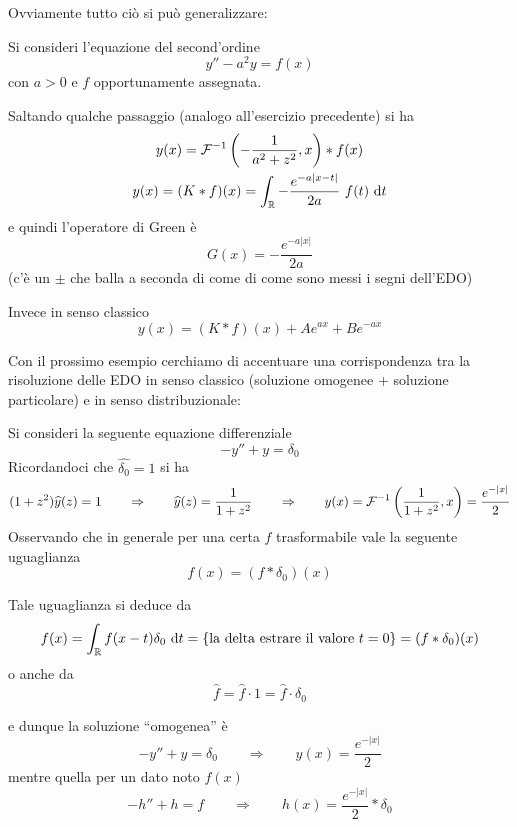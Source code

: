 Ovviamente tutto ciò si può generalizzare:
\begin{exa}
Si consideri l'equazione del second'ordine
\begin{equation*}
y''-a^2y=f(x)
\end{equation*}
con $a>0$ e $f$ opportunamente assegnata.

Saltando qualche passaggio (analogo all'esercizio precedente) si ha
\begin{gather*}
y(x)=\mathcal{F}^{-1}\left(-\frac{1}{a^2+z^2},x\right)*f(x) \\
y(x)=(K*f)(x)=\int_{\mathbb{R}} -\frac{e^{-a|x-t|}}{2a}\ f(t)\  \mathrm{d} t
\end{gather*}
e quindi l'operatore di Green è
\begin{equation*}
G(x)=-\frac{e^{-a|x|}}{2a}
\end{equation*}
(c'è un $\pm$ che balla a seconda di come di come sono messi i segni dell'EDO)

Invece in senso classico
\begin{equation*}
y(x)=(K*f)(x)+Ae^{ax}+Be^{-ax}
\end{equation*}
\end{exa}

Con il prossimo esempio cerchiamo di accentuare una corrispondenza tra la risoluzione delle EDO in senso classico (soluzione omogenee + soluzione particolare) e in senso distribuzionale:
\begin{exa}
Si consideri la seguente equazione differenziale
\begin{equation*}
-y''+y=\delta_0
\end{equation*}
Ricordandoci che $\hat{\delta_0}=1$ si ha
\begin{equation*}
(1+z^2)\widehat{y}(z)=1\qquad\Rightarrow\qquad \widehat{y}(z)=\frac{1}{1+z^2}\qquad\Rightarrow\qquad  y(x)=\mathcal{F}^{-1}\left(\frac{1}{1+z^2},x\right)=\frac{e^{-|x|}}{2}
\end{equation*}
Osservando che in generale per una certa $f$ trasformabile vale la seguente uguaglianza
\begin{equation*}
f(x)=(f*\delta_0)(x)
\end{equation*}
\begin{rem}
Tale uguaglianza si deduce da
\begin{equation*}
f(x)=\int_{\mathbb{R}} f(x-t)\delta_0\  \mathrm{d} t=\{\text{la delta estrare il valore }t=0\}=(f*\delta_0)(x)
\end{equation*}
o anche da
\begin{equation*}
\hat{f}=\hat{f}\cdot 1=\hat{f}\cdot\delta_0
\end{equation*}
\end{rem}
e dunque la soluzione ``omogenea'' è
\begin{equation*}
-y''+y=\delta_0\qquad\Rightarrow\qquad y(x)=\frac{e^{-|x|}}{2}
\end{equation*}
mentre quella per un dato noto $f(x)$
\begin{equation*}
-h''+h=f\qquad\Rightarrow\qquad h(x)=\frac{e^{-|x|}}{2}*\delta_0
\end{equation*}
\end{exa}

